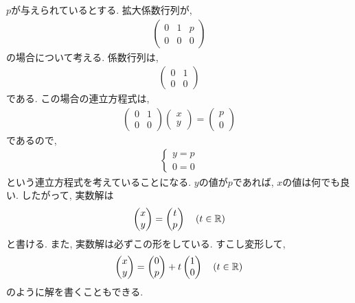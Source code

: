 \begin{example}
      \label{eg:eq:reduced:5}
  $p$が与えられているとする.
  拡大係数行列が,
  \begin{align*}
    \begin{pmatrix}
      0&1&p\\0&0&0
    \end{pmatrix}
  \end{align*}
  の場合について考える.
  係数行列は,
  \begin{align*}
    \begin{pmatrix}
      0&1\\0&0
    \end{pmatrix}
  \end{align*}
  である.
  この場合の連立方程式は,
  \begin{align*}
    \begin{pmatrix}
      0&1\\0&0
    \end{pmatrix}
    \begin{pmatrix}x\\y\end{pmatrix}
      =
      \begin{pmatrix}
        p\\0
      \end{pmatrix}
  \end{align*}
  であるので,
  \begin{align*}
    \begin{cases}
      y=p\\
      0=0
    \end{cases}
  \end{align*}
  という連立方程式を考えていることになる.
  $y$の値が$p$であれば, $x$の値は何でも良い.
  したがって, 実数解は
  \begin{align*}
    \begin{pmatrix}x\\y\end{pmatrix}
      =
      \begin{pmatrix}t\\p\end{pmatrix}
        \quad (t\in\mathbb{R})
  \end{align*}
  と書ける.  また, 実数解は必ずこの形をしている.
  すこし変形して,
  \begin{align*}
    \begin{pmatrix}x\\y\end{pmatrix}
      =
      \begin{pmatrix}0\\p\end{pmatrix}
        +
        t\begin{pmatrix}1\\0\end{pmatrix}
        \quad (t\in\mathbb{R})
  \end{align*}
  のように解を書くこともできる.
\end{example}

